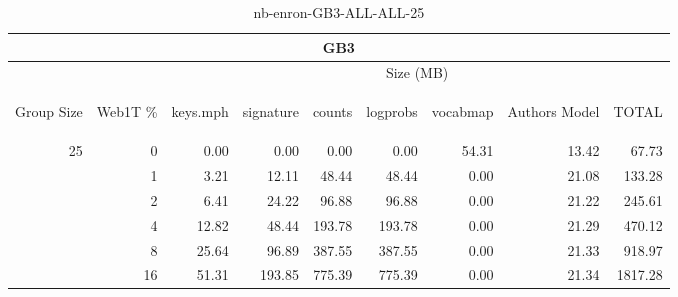 \begin{center}
\begin{table}[htbp]
\begin{tabular}{ | r | r | r | r | r | r | r | r | r |}
\hline
\multicolumn{9}{|c|}{GB3}\\
\hline
 & & \multicolumn{7}{|c|}{Size (MB)}\\ \cline{3-9}
\begin{sideways}Group Size\end{sideways} & \begin{sideways}Web1T \% \end{sideways} & \begin{sideways}keys.mph\end{sideways} & \begin{sideways}signature\end{sideways} & \begin{sideways}counts\end{sideways} & \begin{sideways}logprobs\end{sideways} & \begin{sideways}vocabmap\end{sideways} & \begin{sideways}Authors Model \end{sideways} & \begin{sideways}TOTAL\end{sideways}\\
\hline
\multirow{5}{*}{25}
 & 0 & 0.00 & 0.00 & 0.00 & 0.00 & 54.31 & 13.42 & 67.73\\ \cline{2-9}
 & 1 & 3.21 & 12.11 & 48.44 & 48.44 & 0.00 & 21.08 & 133.28\\ \cline{2-9}
 & 2 & 6.41 & 24.22 & 96.88 & 96.88 & 0.00 & 21.22 & 245.61\\ \cline{2-9}
 & 4 & 12.82 & 48.44 & 193.78 & 193.78 & 0.00 & 21.29 & 470.12\\ \cline{2-9}
 & 8 & 25.64 & 96.89 & 387.55 & 387.55 & 0.00 & 21.33 & 918.97\\ \cline{2-9}
 & 16 & 51.31 & 193.85 & 775.39 & 775.39 & 0.00 & 21.34 & 1817.28\\ \cline{2-9}
\hline
\end{tabular}
\caption{nb-enron-GB3-ALL-ALL-25}
\label{table:nb-enron-GB3-ALL-ALL-25}
\end{table}
\end{center}

